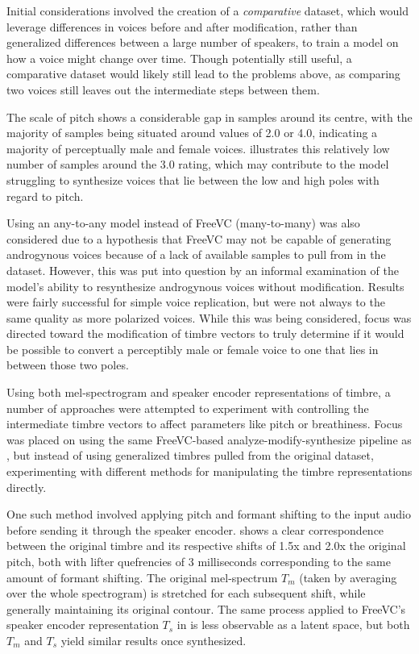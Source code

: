 \documentclass{article}
\begin{document}
Initial considerations involved the creation of a \textit{comparative} dataset, which would leverage differences in voices before and after modification, rather than generalized differences between a large number of speakers, to train a model on how a voice might change over time. Though potentially still useful, a comparative dataset would likely still lead to the problems above, as comparing two voices still leaves out the intermediate steps between them.

The scale of pitch shows a considerable gap in samples around its centre, with the majority of samples being situated around values of 2.0 or 4.0, indicating a majority of perceptually male and female voices.  illustrates this relatively low number of samples around the 3.0 rating, which may contribute to the model struggling to synthesize voices that lie between the low and high poles with regard to pitch.

Using an any-to-any model instead of FreeVC (many-to-many) was also considered due to a hypothesis that FreeVC may not be capable of generating androgynous voices because of a lack of available samples to pull from in the dataset. However, this was put into question by an informal examination of the model's ability to resynthesize androgynous voices without modification. Results were fairly successful for simple voice replication, but were not always to the same quality as more polarized voices. While this was being considered, focus was directed toward the modification of timbre vectors to truly determine if it would be possible to convert a perceptibly male or female voice to one that lies in between those two poles.


Using both mel-spectrogram and speaker encoder representations of timbre, a number of approaches were attempted to experiment with controlling the intermediate timbre vectors to affect parameters like pitch or breathiness. Focus was placed on using the same FreeVC-based analyze-modify-synthesize pipeline as \cite{doyle2025}, but instead of using generalized timbres pulled from the original dataset, experimenting with different methods for manipulating the timbre representations directly.

One such method involved applying pitch and formant shifting to the input audio before sending it through the speaker encoder.  shows a clear correspondence between the original timbre and its respective shifts of 1.5x and 2.0x the original pitch, both with lifter quefrencies of 3 milliseconds corresponding to the same amount of formant shifting. The original mel-spectrum $T_m$ (taken by averaging over the whole spectrogram) is stretched for each subsequent shift, while generally maintaining its original contour. The same process applied to FreeVC's speaker encoder representation $T_s$ in  is less observable as a latent space, but both $T_m$ and $T_s$ yield similar results once synthesized.
\end{document}
